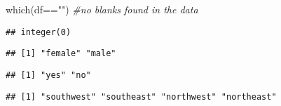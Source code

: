\documentclass[
]{article}
\newenvironment{Shaded}{\begin{snugshade}}{\end{snugshade}}
\newcommand{\CommentTok}[1]{\textcolor[rgb]{0.56,0.35,0.01}{\textit{#1}}}
\newcommand{\FunctionTok}[1]{\textcolor[rgb]{0.00,0.00,0.00}{#1}}
\newcommand{\NormalTok}[1]{#1}
\newcommand{\SpecialCharTok}[1]{\textcolor[rgb]{0.00,0.00,0.00}{#1}}
\newcommand{\StringTok}[1]{\textcolor[rgb]{0.31,0.60,0.02}{#1}}
\begin{document}
\begin{Shaded}
\begin{Highlighting}[]
\FunctionTok{which}\NormalTok{(df}\SpecialCharTok{==}\StringTok{""}\NormalTok{) }\CommentTok{\#no blanks found in the data}
\end{Highlighting}
\end{Shaded}

\begin{verbatim}
## integer(0)
\end{verbatim}

\begin{Shaded}
\end{Shaded}

\begin{verbatim}
## [1] "female" "male"
\end{verbatim}

\begin{Shaded}
\end{Shaded}

\begin{verbatim}
## [1] "yes" "no"
\end{verbatim}

\begin{Shaded}
\end{Shaded}

\begin{verbatim}
## [1] "southwest" "southeast" "northwest" "northeast"
\end{verbatim}
\end{document}
